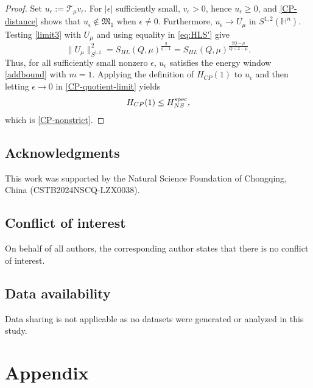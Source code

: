 \documentclass[11pt]{article}
\begin{document}
\begin{proof}
Set $u_\epsilon:=\mathcal T_\mu v_\epsilon$. For $|\epsilon|$ sufficiently small, $v_\epsilon>0$, hence $u_\epsilon\ge0$, and \eqref{CP-distance} shows that $u_\epsilon\notin\mathfrak M_1$ when $\epsilon\ne0$. Furthermore, $u_\epsilon\to U_\mu$ in $S^{1,2}(\mathbb H^n)$. Testing \eqref{limit3} with $U_\mu$ and using equality in \eqref{eq:HLS'} give
\[
 \|U_\mu\|_{S^{1,2}}^2
 =S_{HL}(Q,\mu)^{\frac{q}{q-1}}
 =S_{HL}(Q,\mu)^{\frac{2Q-\mu}{Q+2-\mu}}.
\]
Thus, for all sufficiently small nonzero $\epsilon$, $u_\epsilon$ satisfies the energy window \eqref{addbound} with $m=1$. Applying the definition of $H_{CP}(1)$ to $u_\epsilon$ and then letting $\epsilon\to0$ in \eqref{CP-quotient-limit} yields
\[
 H_{CP}(1)\le H_{NS}^{\rm spec},
\]
which is \eqref{CP-nonstrict}.
\end{proof}
\endgroup

\subsection*{Acknowledgments}
{This work was supported by the Natural Science Foundation of Chongqing, China} (CSTB2024NSCQ-LZX0038).


\subsection*{Conflict of interest}
On behalf of all authors, the corresponding author states that there is no conflict of interest.

\vspace{.2cm}

\subsection*{Data availability}
{Data sharing is not applicable as no datasets were generated or analyzed in this study.}



\section{Appendix}\label{App}


\begingroup
\end{document}
